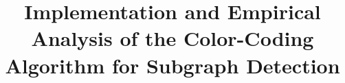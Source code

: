



% 


\documentclass{article}
\usepackage{amsmath, amssymb, graphicx, hyperref, cite, fancyhdr, geometry}
\geometry{a4paper, margin=1in}

\title{Implementation and Empirical Analysis of the Color-Coding Algorithm for Subgraph Detection}
\author{}
\date{}

